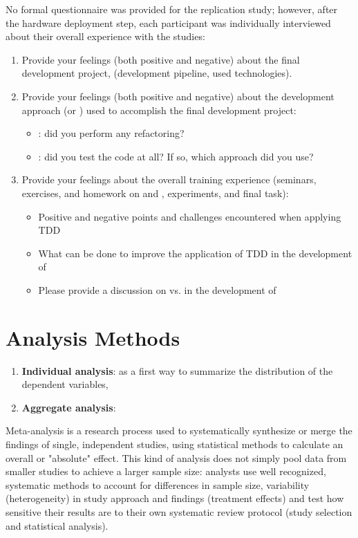 \noindent No formal questionnaire was provided for the replication study; however, after the hardware deployment step, each participant was individually interviewed about their overall experience with the studies:
\begin{enumerate}
    \item Provide your feelings (both positive and negative) about the final development project, (\eg development pipeline, used technologies).
    \item Provide your feelings (both positive and negative) about the development approach (\ie \tdd or \notdd) used to accomplish the final development project:
        \begin{itemize}
            \item \tdd: did you perform any refactoring? 
            \item \notdd: did you test the code at all? If so, which approach did you use?
        \end{itemize}
    \item Provide your feelings about the overall training experience (seminars, exercises, and homework on \tdd and \notdd, experiments, and final task):
        \begin{itemize}
            \item Positive and negative points and challenges encountered when applying TDD
            \item What can be done to improve the application of TDD in the development of \ess
            \item Please provide a discussion on \tdd vs. \notdd in the development of \ess
        \end{itemize}
\end{enumerate}
 




\section{Analysis Methods}
\begin{enumerate}
    \item \textbf{Individual analysis}: as a first way to summarize the distribution of the dependent variables, 
    \item \textbf{Aggregate analysis}:
\end{enumerate}
Meta-analysis is a research process used to systematically synthesize or merge the findings of single, independent studies, using statistical methods to calculate an overall or "absolute" effect. This kind of analysis does not simply pool data from smaller studies to achieve a larger sample size: analysts use well recognized, systematic methods to account for differences in sample size, variability (heterogeneity) in study approach and findings (treatment effects) and test how sensitive their results are to their own systematic review protocol (study selection and statistical analysis).




